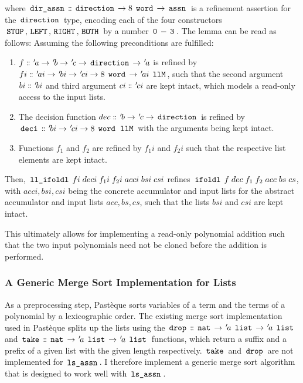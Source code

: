 where $\,\text{\ttfamily dir\_assn}\, \mathrel{\mathord{:}\mkern-1.2mu\mathord{:}} \,\text{\ttfamily direction}\, \rightarrow 8 \; \,\text{\ttfamily word}\, \rightarrow \,\text{\ttfamily assn}\,$ is a refinement assertion for the $\,\text{\ttfamily direction}\,$ type, encoding each of the four constructors $\,\text{\ttfamily STOP}\,, \,\text{\ttfamily LEFT}\,, \,\text{\ttfamily RIGHT}\,, \,\text{\ttfamily BOTH}\,$ by a number $\,\text{\ttfamily 0}\,-\,\text{\ttfamily 3}\,$.
The lemma can be read as follows: Assuming the following preconditions are fulfilled:
\begin{enumerate}
	\item $f \mathrel{\mathord{:}\mkern-1.2mu\mathord{:}} {\mskip2mu '\mskip-2mua} \rightarrow {\mskip2mu '\mskip-2mub} \rightarrow {\mskip2mu '\mskip-2muc} \rightarrow \,\text{\ttfamily direction}\, \rightarrow {\mskip2mu '\mskip-2mua}$ is refined by $fi \mathrel{\mathord{:}\mkern-1.2mu\mathord{:}} {\mskip2mu '\mskip-2muai} \rightarrow {\mskip2mu '\mskip-2mubi} \rightarrow {\mskip2mu '\mskip-2muci} \rightarrow 8 \; \,\text{\ttfamily word}\, \rightarrow {\mskip2mu '\mskip-2muai} \; \,\text{\ttfamily llM}\,$, such that the second argument $bi \mathrel{\mathord{:}\mkern-1.2mu\mathord{:}} {\mskip2mu '\mskip-2mubi}$ and third argument $ci \mathrel{\mathord{:}\mkern-1.2mu\mathord{:}} {\mskip2mu '\mskip-2muci}$ are kept intact, which models a read-only access to the input lists.
	\item The decision function $dec \mathrel{\mathord{:}\mkern-1.2mu\mathord{:}} {\mskip2mu '\mskip-2mub} \rightarrow {\mskip2mu '\mskip-2muc} \rightarrow \,\text{\ttfamily direction}\,$ is refined by $\,\text{\ttfamily deci}\, \mathrel{\mathord{:}\mkern-1.2mu\mathord{:}} {\mskip2mu '\mskip-2mubi} \rightarrow {\mskip2mu '\mskip-2muci} \rightarrow 8 \; \,\text{\ttfamily word}\, \; \,\text{\ttfamily llM}\,$ with the arguments being kept intact.
	\item Functions $f_1$ and $f_2$ are refined by $f_1i$ and $f_2i$ such that the respective list elements are kept intact.
\end{enumerate}
Then, $\,\text{\ttfamily ll\_ifoldl}\, \; fi \; deci \; f_1i \; f_2i \; acci \; bsi \; csi$ refines $\,\text{\ttfamily ifoldl}\, \; f \; dec \; f_1 \; f_2 \; acc \; bs \; cs$, with $acci, bsi, csi$ being the concrete accumulator and input lists for the abstract accumulator and input lists $acc, bs, cs$, such that the lists $bsi$ and $csi$ are kept intact.

This ultimately allows for implementing a read-only polynomial addition such that the two input polynomials need not be cloned before the addition is performed.

\subsubsection{A Generic Merge Sort Implementation for Lists}\label{sec:generic-merge-sort-for-lists}

As a preprocessing step, Pastèque sorts variables of a term and the terms of a polynomial by a lexicographic order.
The existing merge sort implementation used in Pastèque splits up the lists using the $\,\text{\ttfamily drop}\, \mathrel{\mathord{:}\mkern-1.2mu\mathord{:}} \,\text{\ttfamily nat}\, \rightarrow {\mskip2mu '\mskip-2mua} \; \,\text{\ttfamily list}\, \rightarrow {\mskip2mu '\mskip-2mua} \; \,\text{\ttfamily list}\,$ and $\,\text{\ttfamily take}\, \mathrel{\mathord{:}\mkern-1.2mu\mathord{:}} \,\text{\ttfamily nat}\, \rightarrow {\mskip2mu '\mskip-2mua} \; \,\text{\ttfamily list}\, \rightarrow {\mskip2mu '\mskip-2mua} \; \,\text{\ttfamily list}\,$ functions, which return a suffix and a prefix of a given list with the given length respectively.
$\,\text{\ttfamily take}\,$ and $\,\text{\ttfamily drop}\,$ are not implemented for $\,\text{\ttfamily ls\_assn}\,$.
I therefore implement a generic merge sort algorithm that is designed to work well with $\,\text{\ttfamily ls\_assn}\,$.

